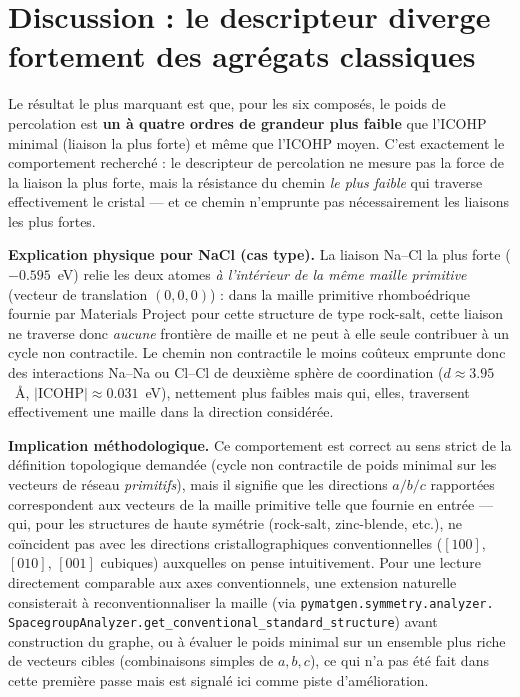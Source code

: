 \documentclass[11pt,a4paper]{article}
\begin{document}
\section{Discussion : le descripteur diverge fortement des agrégats classiques}

Le résultat le plus marquant est que, pour les six composés, le poids de
percolation est \textbf{un à quatre ordres de grandeur plus faible} que
l'ICOHP minimal (liaison la plus forte) et même que l'ICOHP moyen. C'est
exactement le comportement recherché : le descripteur de percolation ne
mesure pas la force de la liaison la plus forte, mais la résistance du
chemin \emph{le plus faible} qui traverse effectivement le cristal --- et
ce chemin n'emprunte pas nécessairement les liaisons les plus fortes.

\textbf{Explication physique pour NaCl (cas type).} La liaison Na--Cl la
plus forte ($-0.595$~eV) relie les deux atomes \emph{à l'intérieur de la
même maille primitive} (vecteur de translation $(0,0,0)$) : dans la maille
primitive rhomboédrique fournie par Materials Project pour cette structure
de type rock-salt, cette liaison ne traverse donc \emph{aucune} frontière
de maille et ne peut à elle seule contribuer à un cycle non contractile.
Le chemin non contractile le moins coûteux emprunte donc des interactions
Na--Na ou Cl--Cl de deuxième sphère de coordination ($d \approx 3.95$~\AA,
$|\text{ICOHP}| \approx 0.031$~eV), nettement plus faibles mais qui, elles,
traversent effectivement une maille dans la direction considérée.

\textbf{Implication méthodologique.} Ce comportement est correct au sens
strict de la définition topologique demandée (cycle non contractile de
poids minimal sur les vecteurs de réseau \emph{primitifs}), mais il signifie
que les directions $a/b/c$ rapportées correspondent aux vecteurs de la
maille primitive telle que fournie en entrée --- qui, pour les structures
de haute symétrie (rock-salt, zinc-blende, etc.), ne coïncident pas avec les
directions cristallographiques conventionnelles ($[100]$, $[010]$, $[001]$
cubiques) auxquelles on pense intuitivement. Pour une lecture directement
comparable aux axes conventionnels, une extension naturelle consisterait à
reconventionnaliser la maille (via \texttt{pymatgen.symmetry.analyzer.
SpacegroupAnalyzer.get\_conventional\_standard\_structure}) avant
construction du graphe, ou à évaluer le poids minimal sur un ensemble plus
riche de vecteurs cibles (combinaisons simples de $a,b,c$), ce qui n'a pas
été fait dans cette première passe mais est signalé ici comme piste
d'amélioration.
\end{document}
